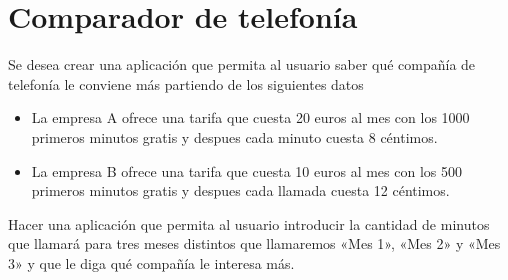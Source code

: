 \documentclass[letterpaper,10pt,spanish]{sphinxmanual}
\begin{document}
\begin{sphinxVerbatim}[commandchars=\\\{\}]
         
\end{sphinxVerbatim}


\section{Comparador de telefonía}
\label{\detokenize{tema4:comparador-de-telefonia}}
Se desea crear una aplicación que permita al usuario saber qué compañía de telefonía le conviene más partiendo de los siguientes datos
\begin{itemize}
\item {} 
La empresa A ofrece una tarifa que cuesta 20 euros al mes con los 1000 primeros minutos gratis y despues cada minuto cuesta 8 céntimos.

\item {} 
La empresa B ofrece una tarifa que cuesta 10 euros al mes con los 500 primeros minutos gratis y despues cada llamada cuesta 12 céntimos.

\end{itemize}

Hacer una aplicación que permita al usuario introducir la cantidad de minutos que llamará para tres meses distintos que llamaremos «Mes 1», «Mes 2» y «Mes 3»  y que le diga qué compañía le interesa más.
\end{document}
